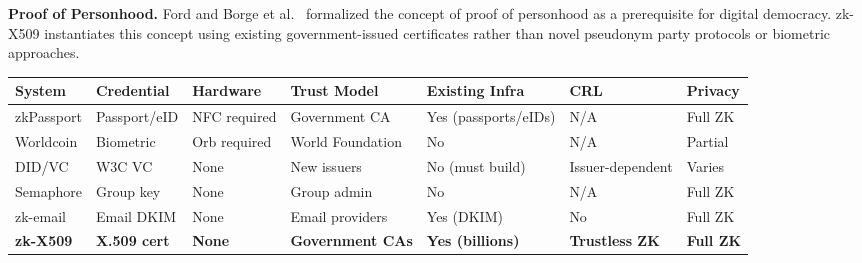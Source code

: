 \documentclass[11pt, a4paper]{article}
\begin{document}
\textbf{Proof of Personhood.} Ford \cite{ref20} and Borge et al.~\cite{ref21}
formalized the concept of proof of personhood as a prerequisite for
digital democracy. zk-X509 instantiates this concept using existing
government-issued certificates rather than novel pseudonym party
protocols or biometric approaches.

\begin{longtable}[]{@{}
  >{\raggedright\arraybackslash}p{}
  >{\raggedright\arraybackslash}p{}
  >{\raggedright\arraybackslash}p{}
  >{\raggedright\arraybackslash}p{}
  >{\raggedright\arraybackslash}p{}
  >{\raggedright\arraybackslash}p{}
  >{\raggedright\arraybackslash}p{}@{}}
\toprule\noalign{}
\begin{minipage}[b]{\linewidth}\raggedright
System
\end{minipage} & \begin{minipage}[b]{\linewidth}\raggedright
Credential
\end{minipage} & \begin{minipage}[b]{\linewidth}\raggedright
Hardware
\end{minipage} & \begin{minipage}[b]{\linewidth}\raggedright
Trust Model
\end{minipage} & \begin{minipage}[b]{\linewidth}\raggedright
Existing Infra
\end{minipage} & \begin{minipage}[b]{\linewidth}\raggedright
CRL
\end{minipage} & \begin{minipage}[b]{\linewidth}\raggedright
Privacy
\end{minipage} \\
\midrule\noalign{}
\endhead
\bottomrule\noalign{}
\endlastfoot
zkPassport \cite{ref2} & Passport/eID & NFC required & Government CA & Yes
(passports/eIDs) & N/A & Full ZK \\
Worldcoin \cite{ref3} & Biometric & Orb required & World Foundation & No
& N/A & Partial \\
DID/VC \cite{ref13} & W3C VC & None & New issuers & No (must build) &
Issuer-dependent & Varies \\
Semaphore \cite{ref8} & Group key & None & Group admin & No & N/A & Full
ZK \\
zk-email \cite{ref9} & Email DKIM & None & Email providers & Yes (DKIM) & No
& Full ZK \\
\textbf{zk-X509} & \textbf{X.509 cert} & \textbf{None} &
\textbf{Government CAs} & \textbf{Yes (billions)} & \textbf{Trustless
ZK} & \textbf{Full ZK} \\
\end{longtable}
\end{document}
